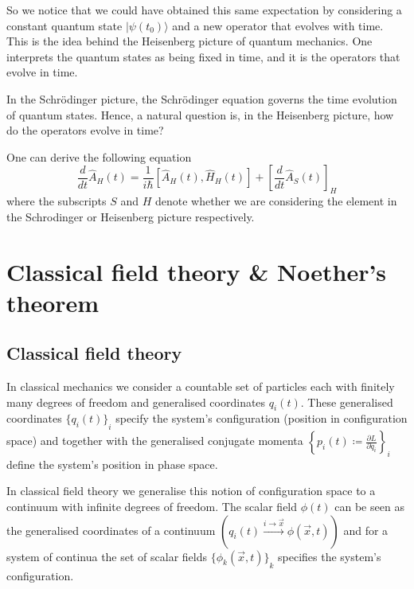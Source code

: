 \documentclass[11pt, a4paper]{article}
\theoremstyle{definition}
\theoremstyle{plain}
\begin{document}
So we notice that we could have obtained this same 
expectation by considering a constant quantum state 
$| \psi(t_0) \rangle$ and a new operator that evolves with 
time. This is the idea behind the Heisenberg picture of 
quantum mechanics. One interprets the quantum states as 
being fixed in time, and it is the operators that evolve 
in time. 

In the Schrödinger picture, the Schrödinger equation 
governs the time evolution of quantum states. Hence, a 
natural question is, in the Heisenberg picture, how do the 
operators evolve in time?

One can derive the following equation
\[ \frac{d}{dt} \hat{A}_H(t) = \frac{1}{i \hbar} [\hat{A}_H(t), \hat{H}_H(t)] + \left[\frac{d}{dt} \hat{A}_S(t) \right]_H \]
where the subscripts $S$ and $H$ denote whether we are considering the element in the Schrodinger or Heisenberg picture respectively. 

\section{Classical field theory \& Noether's theorem}

\subsection{Classical field theory}
In classical mechanics we consider a countable set of particles
each with finitely many degrees of freedom
and generalised coordinates $q_i(t)$. These generalised coordinates ${\{ q_i(t) \}}_i$ specify
the system's configuration (position in configuration space) and together with the 
generalised conjugate momenta
${\left\{p_i(t) \coloneq \frac{\partial L}{\partial \dot{q}_i} \right\}}_i $ 
define the system's position in phase space.

In classical field theory we generalise this notion of configuration space to a
continuum with infinite degrees of freedom. The scalar field $\phi(t)$ can be seen as
the generalised coordinates of a continuum 
$\left( q_i(t) \xrightarrow{i \rightarrow \vec{x}} \phi(\vec{x}, t) \right)$ and for a system
of continua the set of scalar fields ${\{ \phi_k(\vec{x}, t) \}}_k$
specifies the system's configuration.
\end{document}
